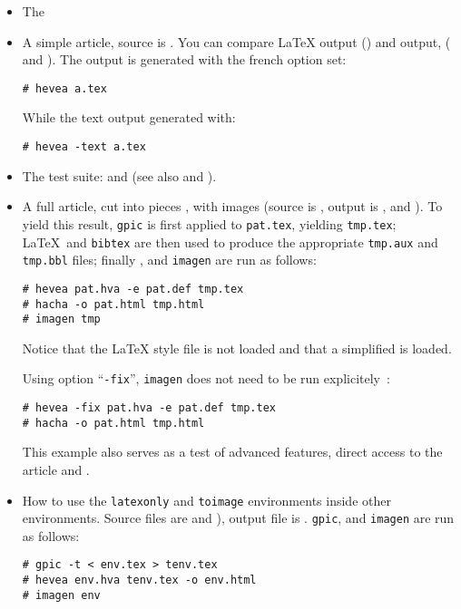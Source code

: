 \documentclass{article}
\begin{document}
\begin{itemize}
\item The 

\item A simple article,  source is .
You can compare \LaTeX{} output () and \hevea{} output,
( and ). The \html{} output is
generated with the french option set:
\begin{verbatim}
# hevea a.tex
\end{verbatim}
While the text output generated with:
\begin{verbatim}
# hevea -text a.tex
\end{verbatim}

\item The test suite:  and  (see
also  and ).

\item A full article, cut into pieces , with images (source is
, output is , 
 and ). To yield this result, \verb+gpic+ is first
applied to \verb+pat.tex+, yielding \verb+tmp.tex+; \LaTeX\ and
\texttt{bibtex} are then used to produce the appropriate \verb+tmp.aux+ and
\verb+tmp.bbl+ files; finally \hevea{}, \hacha{} and \texttt{imagen}
are run as follows:
\begin{verbatim}
# hevea pat.hva -e pat.def tmp.tex
# hacha -o pat.html tmp.html
# imagen tmp
\end{verbatim}
Notice that the \LaTeX{} style file  is not loaded and
that a simplified  is loaded.

Using option ``\texttt{-fix}'', \texttt{imagen} does not need to be
run explicitely~:
\begin{verbatim}
# hevea -fix pat.hva -e pat.def tmp.tex
# hacha -o pat.html tmp.html
\end{verbatim}

This example also serves as a test of \hacha{} advanced features,
direct access to the article 
and .

\item How to use the \verb+latexonly+ and \verb+toimage+ environments
inside other environments.
Source files are  and
), output file is .
\texttt{gpic}, \hevea{} and \texttt{imagen}
are run as follows:
\begin{verbatim}
# gpic -t < env.tex > tenv.tex
# hevea env.hva tenv.tex -o env.html
# imagen env
\end{verbatim}


\end{itemize}
\end{document}
